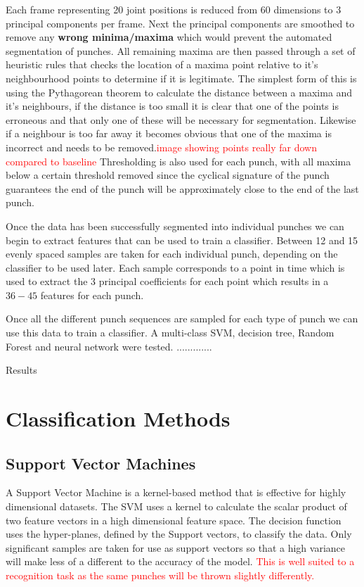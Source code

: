 Each frame representing 20 joint positions is reduced from 60 dimensions to 3 principal components per frame. Next the principal components are smoothed to remove any {\bf wrong minima/maxima} which would prevent the automated segmentation of punches. All remaining maxima are then passed through a set of heuristic rules that checks the location of a maxima point relative to it's neighbourhood points to determine if it is legitimate. The simplest form of this is using the Pythagorean theorem to calculate the distance between a maxima and it's neighbours, if the distance is too small it is clear that one of the points is erroneous and that only one of these will be necessary for segmentation. Likewise if a neighbour is too far away it becomes obvious that one of the maxima is incorrect and needs to be removed.\textcolor{red}{image showing points really far down compared to baseline} Thresholding is also used for each punch, with all maxima below a certain threshold removed since the cyclical signature of the punch guarantees the end of the punch will be approximately close to the end of the last punch.

Once the data has been successfully segmented into individual punches we can begin to extract features that can be used to train a classifier. Between 12 and 15 evenly spaced samples are taken for each individual punch, depending on the classifier to be used later. Each sample corresponds to a point in time which is used to extract the 3 principal coefficients for each point which results in a $36 - 45$ features for each punch.

Once all the different punch sequences are sampled for each type of punch we can use this data to train a classifier. A multi-class SVM, decision tree, Random Forest and neural network were tested. .............

Results


\section{Classification Methods}

\subsection{Support Vector Machines}
A Support Vector Machine is a kernel-based method that is effective for highly dimensional datasets. The SVM uses a kernel to calculate the scalar product of two feature vectors in a high dimensional feature space. The decision function uses the hyper-planes, defined by the Support  vectors,  to  classify  the  data.  Only  significant  samples  are  taken  for  use  as support vectors so that a high variance will make less of a different to the accuracy of the model. \textcolor{red}{This is well suited to a recognition task as the same punches will be thrown slightly differently.}

